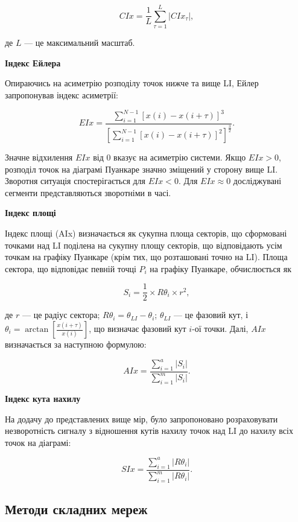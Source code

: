 \documentclass[
  letterpaper,
]{report}
\begin{document}
\[ 
CIx = \frac{1}{L} \sum_{\tau=1}^{L} |CIx_{\tau}|, 
\]

де \(L\) --- це максимальний масштаб.

\textbf{Індекс Ейлера}

Опираючись на асиметрію розподілу точок нижче та вище LI, Ейлер
запропонував індекс асиметрії:

\[ 
EIx = \frac{\sum_{i=1}^{N-1} \left[ x(i)-x(i+\tau) \right]^{3}}{\left[ \sum_{i=1}^{N-1} \left[ x(i)-x(i+\tau) \right]^{2} \right]^{\frac{3}{2}}}. 
\]

Значне відхилення \(EIx\) від 0 вказує на асиметрію системи. Якщо
\(EIx>0\), розподіл точок на діаграмі Пуанкаре значно зміщений у сторону
вище LI. Зворотня ситуація спостерігається для \(EIx<0\). Для
\(EIx \approx 0\) досліджувані сегменти представляються зворотніми в
часі.

\textbf{Індекс площі}

Індекс площі (AIx) визначається як сукупна площа секторів, що сформовані
точками над LI поділена на сукупну площу секторів, що відповідають усім
точкам на графіку Пуанкаре (крім тих, що розташовані точно на LI). Площа
сектора, що відповідає певній точці \(P_{i}\) на графіку Пуанкаре,
обчислюється як

\[ 
S_{i} = \frac{1}{2} \times R\theta_{i} \times r^{2}, 
\]

де \(r\) --- це радіус сектора;
\(R\theta_{i} = \theta_{LI} - \theta_{i}\); \(\theta_{LI}\) --- це
фазовий кут, і
\(\theta_{i} = \arctan{\left[ \frac{x(i+\tau)}{x(i)} \right]}\), що
визначає фазовий кут \(i\)-ої точки. Далі, \(AIx\) визначається за
наступною формулою:

\[ 
AIx = \frac{\sum_{i=1}^{a}|S_{i}|}{\sum_{i=1}^{m}|S_{i}|}. 
\]

\textbf{Індекс кута нахилу}

На додачу до представлених вище мір, було запропоновано розраховувати
незворотність сигналу з відношення кутів нахилу точок над LI до нахилу
всіх точок на діаграмі:

\[ 
SIx = \frac{\sum_{i=1}^{a}|R\theta_{i}|}{\sum_{i=1}^{m}|R\theta_{i}|}. 
\]

\hypertarget{ux43cux435ux442ux43eux434ux438-ux441ux43aux43bux430ux434ux43dux438ux445-ux43cux435ux440ux435ux436}{%
\subsection{Методи складних
мереж}\label{ux43cux435ux442ux43eux434ux438-ux441ux43aux43bux430ux434ux43dux438ux445-ux43cux435ux440ux435ux436}}
\end{document}
